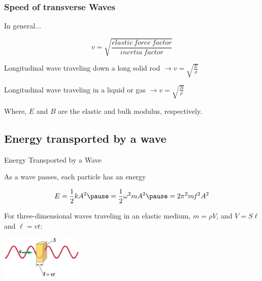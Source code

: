 \documentclass[]{beamer}
\begin{document}
\begin{frame}
\frametitle{Speed of transverse Waves}

In general...

\pause
\begin{equation*}
 v=\sqrt{\frac{elastic~force~factor}{inertia~factor}}
\end{equation*}
\pause
\vspace{2mm}

Longitudinal wave traveling down a long solid rod $ \rightarrow v=\sqrt{\frac{E}{\rho}}$

\pause
\vspace{2mm}
Longitudinal wave traveling in a liquid or gas $ \rightarrow v=\sqrt{\frac{B}{\rho}}$

\pause
\vspace{4mm}
Where, $E$ and $B$ are the elastic and bulk modulus, respectively.

  \end{frame}


\subsection{Energy transported by a wave}
\begin{frame}
\textcolor{mypink1}{Energy Transported by a Wave}
\pause
\vspace{4mm}


As a wave passes, each particle has an energy
\pause

\vspace{4mm}


\begin{equation}
 E=\frac{1}{2} k A^2\pause=\frac{1}{2} \omega^2 mA^2\pause= 2\pi^2 m\mathit{f}^2A^2
\end{equation}

\pause

\vspace{4mm}

For three-dimensional waves traveling in an elastic medium, $m=\rho V$, and $V=S\ell$ and $\ell=vt$:

\pause
  \begin{center}
  \includegraphics[height=0.8in]{images4/7.jpg}
\end{center}


  \end{frame}
\end{document}
